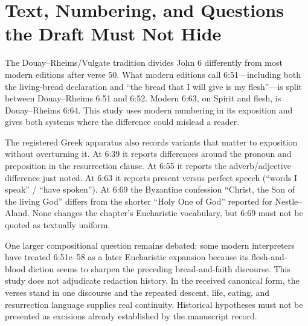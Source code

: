 \section{Text, Numbering, and Questions the Draft Must Not Hide}

The Douay--Rheims/Vulgate tradition divides John 6 differently from most modern
editions after verse 50. What modern editions call 6:51---including both the
living-bread declaration and ``the bread that I will give is my flesh''---is
split between Douay--Rheims 6:51 and 6:52. Modern 6:63, on Spirit and flesh, is
Douay--Rheims 6:64. This study uses modern numbering in its exposition and
gives both systems where the difference could mislead a reader.

The registered Greek apparatus also records variants that matter to exposition
without overturning it. At 6:39 it reports differences around the pronoun and
preposition in the resurrection clause. At 6:55 it reports the adverb/adjective
difference just noted. At 6:63 it reports present versus perfect speech
(``words I speak'' / ``have spoken''). At 6:69 the Byzantine confession
``Christ, the Son of the living God'' differs from the shorter ``Holy One of
God'' reported for Nestle--Aland. None changes the chapter's Eucharistic
vocabulary, but 6:69 must not be quoted as textually uniform.

One larger compositional question remains debated: some modern interpreters
have treated 6:51c--58 as a later Eucharistic expansion because its flesh-and-
blood diction seems to sharpen the preceding bread-and-faith discourse. This
study does not adjudicate redaction history. In the received canonical form,
the verses stand in one discourse and the repeated descent, life, eating, and
resurrection language supplies real continuity. Historical hypotheses must not
be presented as excisions already established by the manuscript record.

